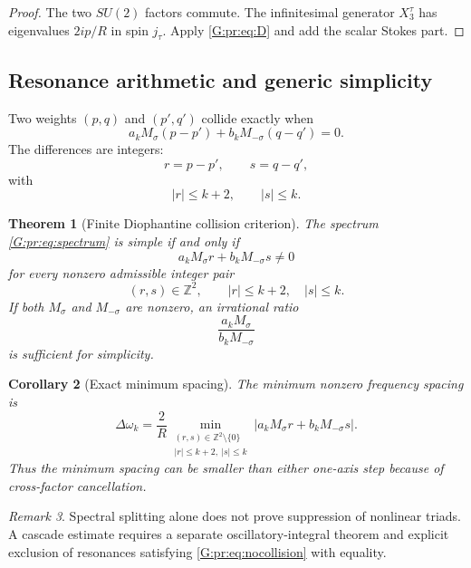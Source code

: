 \documentclass[
 aps,
 prd,
 reprint,
 amsmath,
 amssymb,
 nofootinbib,
 superscriptaddress
]{revtex4-2}
\newtheorem{theorem}{Theorem}[section]
\newtheorem{corollary}[theorem]{Corollary}
\theoremstyle{definition}
\theoremstyle{remark}
\newtheorem{remark}[theorem]{Remark}
\begin{document}
\begin{proof}
The two \(SU(2)\) factors commute.  The infinitesimal generator
\(X_3^\tau\) has eigenvalues \(2ip/R\) in spin \(j_\tau\).  Apply
\eqref{G:pr:eq:D} and add the scalar Stokes part.
\end{proof}

\subsection{Resonance arithmetic and generic simplicity}

Two weights \((p,q)\) and \((p',q')\) collide exactly when
\[
 a_kM_\sigma(p-p')
 +
 b_kM_{-\sigma}(q-q')
 =
 0.
\]
The differences are integers:
\[
 r=p-p',
 \qquad
 s=q-q',
\]
with
\[
 |r|\le k+2,
 \qquad
 |s|\le k.
\]

\begin{theorem}[Finite Diophantine collision criterion]
\label{G:pr:thm:collision}
The spectrum \eqref{G:pr:eq:spectrum} is simple if and only if
\begin{equation}
 a_kM_\sigma r+b_kM_{-\sigma}s\ne0
 \label{G:pr:eq:nocollision}
\end{equation}
for every nonzero admissible integer pair
\[
 (r,s)\in\mathbb Z^2,
 \qquad
 |r|\le k+2,\quad |s|\le k.
\]
If both \(M_\sigma\) and \(M_{-\sigma}\) are nonzero, an irrational ratio
\[
 \frac{a_kM_\sigma}{b_kM_{-\sigma}}
\]
is sufficient for simplicity.
\end{theorem}

\begin{corollary}[Exact minimum spacing]
\label{G:pr:cor:spacing}
The minimum nonzero frequency spacing is
\begin{equation}
 \boxed{
 \Delta\omega_k
 =
 \frac2R
 \min_{\substack{(r,s)\in\mathbb Z^2\setminus\{0\}\\
 |r|\le k+2,\ |s|\le k}}
 |a_kM_\sigma r+b_kM_{-\sigma}s|.
 }
 \label{G:pr:eq:spacing}
\end{equation}
Thus the minimum spacing can be smaller than either one-axis step because of
cross-factor cancellation.
\end{corollary}

\begin{remark}
Spectral splitting alone does not prove suppression of nonlinear triads.
A cascade estimate requires a separate oscillatory-integral theorem and
explicit exclusion of resonances satisfying \eqref{G:pr:eq:nocollision} with
equality.
\end{remark}
\end{document}
